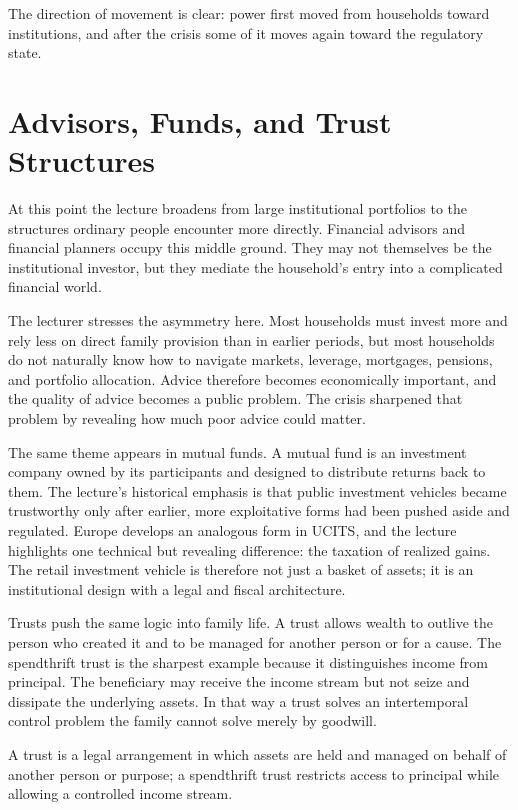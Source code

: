 The direction of movement is clear: power first moved from households toward institutions, and after the crisis some of it moves again toward the regulatory state.

\section{Advisors, Funds, and Trust Structures}

At this point the lecture broadens from large institutional portfolios to the structures ordinary people encounter more directly. Financial advisors and financial planners occupy this middle ground. They may not themselves be the institutional investor, but they mediate the household's entry into a complicated financial world.

The lecturer stresses the asymmetry here. Most households must invest more and rely less on direct family provision than in earlier periods, but most households do not naturally know how to navigate markets, leverage, mortgages, pensions, and portfolio allocation. Advice therefore becomes economically important, and the quality of advice becomes a public problem. The crisis sharpened that problem by revealing how much poor advice could matter.

The same theme appears in mutual funds. A mutual fund is an investment company owned by its participants and designed to distribute returns back to them. The lecture's historical emphasis is that public investment vehicles became trustworthy only after earlier, more exploitative forms had been pushed aside and regulated. Europe develops an analogous form in UCITS, and the lecture highlights one technical but revealing difference: the taxation of realized gains. The retail investment vehicle is therefore not just a basket of assets; it is an institutional design with a legal and fiscal architecture.

Trusts push the same logic into family life. A trust allows wealth to outlive the person who created it and to be managed for another person or for a cause. The spendthrift trust is the sharpest example because it distinguishes income from principal. The beneficiary may receive the income stream but not seize and dissipate the underlying assets. In that way a trust solves an intertemporal control problem the family cannot solve merely by goodwill.

\begin{definition}
A trust is a legal arrangement in which assets are held and managed on behalf of another person or purpose; a spendthrift trust restricts access to principal while allowing a controlled income stream.
\end{definition}

